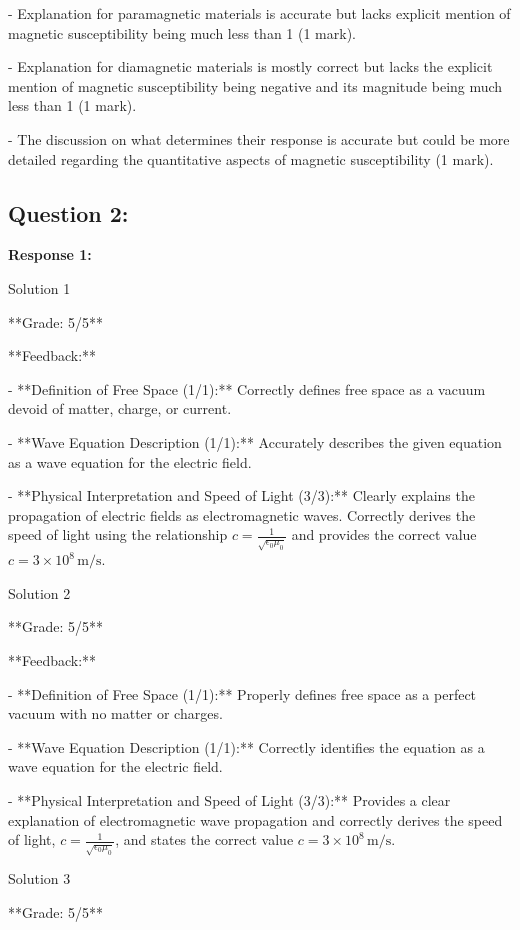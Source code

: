 \documentclass[a4paper,11pt]{article}
\begin{document}
- Explanation for paramagnetic materials is accurate but lacks explicit mention of magnetic susceptibility being much less than 1 (1 mark).

- Explanation for diamagnetic materials is mostly correct but lacks the explicit mention of magnetic susceptibility being negative and its magnitude being much less than 1 (1 mark).

- The discussion on what determines their response is accurate but could be more detailed regarding the quantitative aspects of magnetic susceptibility (1 mark).

\subsection*{Question 2:}

\textbf{Response 1:}

Solution 1

**Grade: 5/5**

**Feedback:**

- **Definition of Free Space (1/1):** Correctly defines free space as a vacuum devoid of matter, charge, or current.

- **Wave Equation Description (1/1):** Accurately describes the given equation as a wave equation for the electric field.

- **Physical Interpretation and Speed of Light (3/3):** Clearly explains the propagation of electric fields as electromagnetic waves. Correctly derives the speed of light using the relationship \( c = \frac{1}{\sqrt{\epsilon_{0}\mu_{0}}} \) and provides the correct value \( c = 3 \times 10^8 \, \text{m/s} \).

Solution 2

**Grade: 5/5**

**Feedback:**

- **Definition of Free Space (1/1):** Properly defines free space as a perfect vacuum with no matter or charges.

- **Wave Equation Description (1/1):** Correctly identifies the equation as a wave equation for the electric field.

- **Physical Interpretation and Speed of Light (3/3):** Provides a clear explanation of electromagnetic wave propagation and correctly derives the speed of light, \( c = \frac{1}{\sqrt{\epsilon_{0}\mu_{0}}} \), and states the correct value \( c = 3 \times 10^8 \, \text{m/s} \).

Solution 3

**Grade: 5/5**
\end{document}
